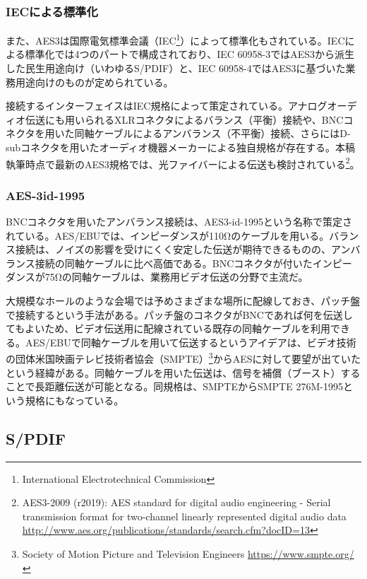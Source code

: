 \subsubsection{IECによる標準化}

また、AES3は国際電気標準会議（IEC\footnote{International Electrotechnical Commission}）によって標準化もされている。IECによる標準化では4つのパートで構成されており、IEC 60958-3ではAES3から派生した民生用途向け（いわゆるS/PDIF）と、IEC 60958-4ではAES3に基づいた業務用途向けのものが定められている。

接続するインターフェイスはIEC規格によって策定されている。アナログオーディオ伝送にも用いられるXLRコネクタによるバランス（平衡）接続や、BNCコネクタを用いた同軸ケーブルによるアンバランス（不平衡）接続、さらにはD-subコネクタを用いたオーディオ機器メーカーによる独自規格が存在する。本稿執筆時点で最新のAES3規格では、光ファイバーによる伝送も検討されている\footnote{AES3-2009 (r2019): AES standard for digital audio engineering - Serial transmission format for two-channel linearly represented digital audio data \url{http://www.aes.org/publications/standards/search.cfm?docID=13}}。

\subsubsection{AES-3id-1995}

BNCコネクタを用いたアンバランス接続は、AES3-id-1995という名称で策定されている。AES/EBUでは、インピーダンスが110Ωのケーブルを用いる。バランス接続は、ノイズの影響を受けにくく安定した伝送が期待できるものの、アンバランス接続の同軸ケーブルに比べ高価である。BNCコネクタが付いたインピーダンスが75Ωの同軸ケーブルは、業務用ビデオ伝送の分野で主流だ。

大規模なホールのような会場では予めさまざまな場所に配線しておき、パッチ盤で接続するという手法がある。パッチ盤のコネクタがBNCであれば何を伝送してもよいため、ビデオ伝送用に配線されている既存の同軸ケーブルを利用できる。AES/EBUで同軸ケーブルを用いて伝送するというアイデアは、ビデオ技術の団体米国映画テレビ技術者協会（SMPTE）\footnote{Society of Motion Picture and Television Engineers \url{https://www.smpte.org/}}からAESに対して要望が出ていたという経緯がある\cite{aes3id-1995-column}。同軸ケーブルを用いた伝送は、信号を補償（ブースト）することで長距離伝送が可能となる。同規格は、SMPTEからSMPTE 276M-1995という規格にもなっている。

\subsection{S/PDIF}

